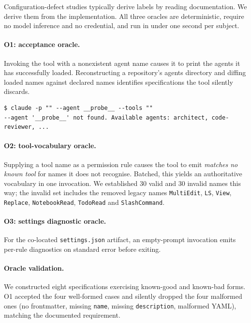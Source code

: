 \documentclass[smallextended,natbib]{svjour3}
\newcommand{\code}[1]{\texttt{\small #1}}
\begin{document}
Configuration-defect studies typically derive labels by reading documentation. We derive them from the
implementation. All three oracles are deterministic, require no model inference and no credential, and
run in under one second per subject.

\paragraph{O1: acceptance oracle.} Invoking the tool with a nonexistent agent name causes it to print
the agents it has successfully loaded. Reconstructing a repository's agents directory and diffing
loaded names against declared names identifies specifications the tool silently discards.

\begin{lstlisting}
$ claude -p "" --agent __probe__ --tools ""
--agent '__probe__' not found. Available agents: architect, code-reviewer, ...
\end{lstlisting}

\paragraph{O2: tool-vocabulary oracle.} Supplying a tool name as a permission rule causes the tool to
emit \emph{matches no known tool} for names it does not recognise. Batched, this yields an
authoritative vocabulary in one invocation. We established 30 valid and 30 invalid names this way;
the invalid set includes the removed legacy names \code{MultiEdit}, \code{LS}, \code{View},
\code{Replace}, \code{NotebookRead}, \code{TodoRead} and \code{SlashCommand}.

\paragraph{O3: settings diagnostic oracle.} For the co-located \code{settings.json} artifact, an
empty-prompt invocation emits per-rule diagnostics on standard error before exiting.

\paragraph{Oracle validation.} We constructed eight specifications exercising known-good and
known-bad forms. O1 accepted the four well-formed cases and silently dropped the four malformed ones
(no frontmatter, missing \code{name}, missing \code{description}, malformed YAML), matching the
documented requirement.
\end{document}
